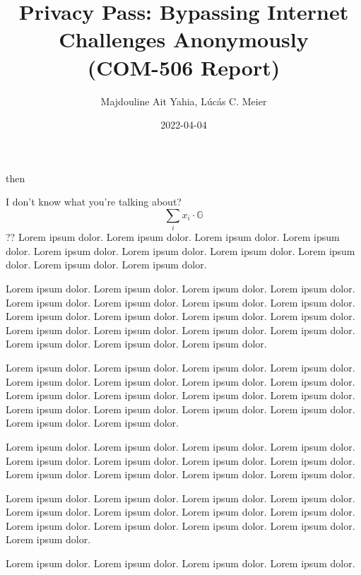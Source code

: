 \documentclass[10pt, a4paper]{article}
\date{2022-04-04}
\title{Privacy Pass: Bypassing Internet Challenges Anonymously\\
\large (COM-506 Report)
}
\author{Majdouline Ait Yahia, Lúcás C. Meier}
\begin{document}
\maketitle
\cite{maurer_2009} then \cite{davidson_privacy_2018}

I don't know what you're talking about?
$$
\sum_i x_i \cdot \mathbb{G}
$$
??
Lorem ipsum dolor.
Lorem ipsum dolor.
Lorem ipsum dolor.
Lorem ipsum dolor.
Lorem ipsum dolor.
Lorem ipsum dolor.
Lorem ipsum dolor.
Lorem ipsum dolor.
Lorem ipsum dolor.
Lorem ipsum dolor.

Lorem ipsum dolor.
Lorem ipsum dolor.
Lorem ipsum dolor.
Lorem ipsum dolor.
Lorem ipsum dolor.
Lorem ipsum dolor.
Lorem ipsum dolor.
Lorem ipsum dolor.
Lorem ipsum dolor.
Lorem ipsum dolor.
Lorem ipsum dolor.
Lorem ipsum dolor.
Lorem ipsum dolor.
Lorem ipsum dolor.
Lorem ipsum dolor.
Lorem ipsum dolor.
Lorem ipsum dolor.
Lorem ipsum dolor.
Lorem ipsum dolor.

Lorem ipsum dolor.
Lorem ipsum dolor.
Lorem ipsum dolor.
Lorem ipsum dolor.
Lorem ipsum dolor.
Lorem ipsum dolor.
Lorem ipsum dolor.
Lorem ipsum dolor.
Lorem ipsum dolor.
Lorem ipsum dolor.
Lorem ipsum dolor.
Lorem ipsum dolor.
Lorem ipsum dolor.
Lorem ipsum dolor.
Lorem ipsum dolor.
Lorem ipsum dolor.
Lorem ipsum dolor.
Lorem ipsum dolor.

Lorem ipsum dolor.
Lorem ipsum dolor.
Lorem ipsum dolor.
Lorem ipsum dolor.
Lorem ipsum dolor.
Lorem ipsum dolor.
Lorem ipsum dolor.
Lorem ipsum dolor.
Lorem ipsum dolor.
Lorem ipsum dolor.
Lorem ipsum dolor.
Lorem ipsum dolor.

Lorem ipsum dolor.
Lorem ipsum dolor.
Lorem ipsum dolor.
Lorem ipsum dolor.
Lorem ipsum dolor.
Lorem ipsum dolor.
Lorem ipsum dolor.
Lorem ipsum dolor.
Lorem ipsum dolor.
Lorem ipsum dolor.
Lorem ipsum dolor.
Lorem ipsum dolor.
Lorem ipsum dolor.

Lorem ipsum dolor.
Lorem ipsum dolor.
Lorem ipsum dolor.
Lorem ipsum dolor.


\footnotesize 
\end{document}
